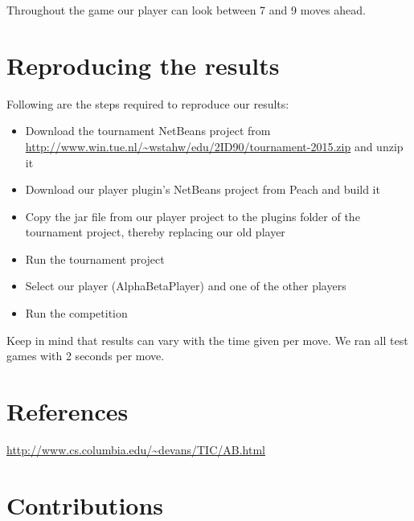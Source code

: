 \documentclass[11pt,a4paper]{article}
\begin{document}
Throughout the game our player can look between 7 and 9 moves ahead.

\section{Reproducing the results}
Following are the steps required to reproduce our results:
\begin{itemize}
\item Download the tournament NetBeans project from \url{http://www.win.tue.nl/~wstahw/edu/2ID90/tournament-2015.zip} and unzip it
\item Download our player plugin's NetBeans project from Peach and build it
\item Copy the jar file from our player project to the plugins folder of the tournament project, thereby replacing our old player
\item Run the tournament project
\item Select our player (AlphaBetaPlayer) and one of the other players
\item Run the competition
\end{itemize}
Keep in mind that results can vary with the time given per move. We ran all test games with 2 seconds per move.

\section{References}
\url{http://www.cs.columbia.edu/~devans/TIC/AB.html}

\section{Contributions}
\end{document}
